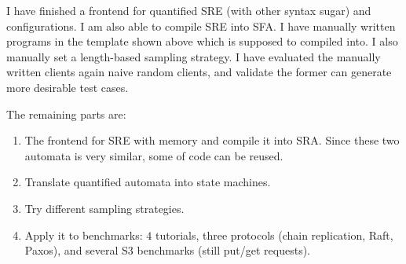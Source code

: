 I have finished a frontend for quantified SRE (with other syntax sugar) and configurations. I am also able to compile SRE into SFA. I have manually written  programs in the template shown above which is supposed to compiled into. I also manually set a length-based sampling strategy. I have evaluated the manually written clients again naive random clients, and validate the former can generate more desirable test cases.

The remaining parts are:
\begin{enumerate}
    \item The frontend for SRE with memory and compile it into SRA. Since these two automata is very similar, some of code can be reused.
    \item Translate quantified automata into  state machines.
    \item Try different sampling strategies.
    \item Apply it to benchmarks: $4$ tutorials, three protocols (chain replication, Raft, Paxos), and several S3 benchmarks (still put/get requests).
\end{enumerate}